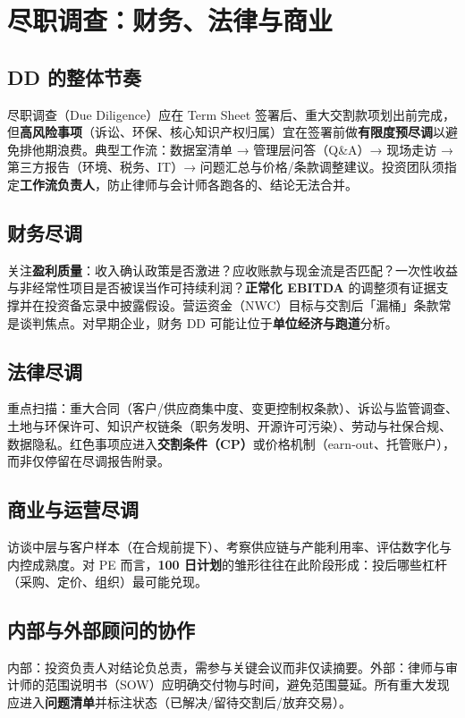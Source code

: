\chapter{尽职调查：财务、法律与商业}

\section{DD 的整体节奏}

尽职调查（Due Diligence）应在 Term Sheet 签署后、重大交割款项划出前完成，但\textbf{高风险事项}（诉讼、环保、核心知识产权归属）宜在签署前做\textbf{有限度预尽调}以避免排他期浪费。典型工作流：数据室清单 → 管理层问答（Q\&A）→ 现场走访 → 第三方报告（环境、税务、IT）→ 问题汇总与价格/条款调整建议。投资团队须指定\textbf{工作流负责人}，防止律师与会计师各跑各的、结论无法合并。

\section{财务尽调}

关注\textbf{盈利质量}：收入确认政策是否激进？应收账款与现金流是否匹配？一次性收益与非经常性项目是否被误当作可持续利润？\textbf{正常化 EBITDA} 的调整须有证据支撑并在投资备忘录中披露假设。营运资金（NWC）目标与交割后「漏桶」条款常是谈判焦点。对早期企业，财务 DD 可能让位于\textbf{单位经济与跑道}分析。

\section{法律尽调}

重点扫描：重大合同（客户/供应商集中度、变更控制权条款）、诉讼与监管调查、土地与环保许可、知识产权链条（职务发明、开源许可污染）、劳动与社保合规、数据隐私。红色事项应进入\textbf{交割条件（CP）}或价格机制（earn-out、托管账户），而非仅停留在尽调报告附录。

\section{商业与运营尽调}

访谈中层与客户样本（在合规前提下）、考察供应链与产能利用率、评估数字化与内控成熟度。对 PE 而言，\textbf{100 日计划}的雏形往往在此阶段形成：投后哪些杠杆（采购、定价、组织）最可能兑现。

\section{内部与外部顾问的协作}

内部：投资负责人对结论负总责，需参与关键会议而非仅读摘要。外部：律师与审计师的范围说明书（SOW）应明确交付物与时间，避免范围蔓延。所有重大发现应进入\textbf{问题清单}并标注状态（已解决/留待交割后/放弃交易）。
